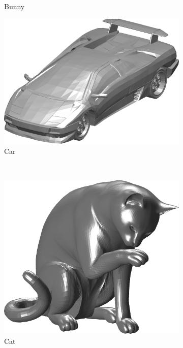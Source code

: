\begin{figure}
\begin{subfigure}[t]{0.19\linewidth}
		\caption{Bunny} 	
	\end{subfigure} 
	\begin{subfigure}[t]{0.19\linewidth} \centering
		\includegraphics[width=1\linewidth]{./fig/eval/05car.png}  
		\caption{Car} 	
	\end{subfigure} \\ 
	\begin{subfigure}[t]{0.19\linewidth} \centering
		\includegraphics[width=1\linewidth]{./fig/eval/06cat.png}  
		\caption{Cat} 	
	\end{subfigure}
	\begin{subfigure}[t]{0.19\linewidth} \centering

\end{subfigure}
\end{figure}
